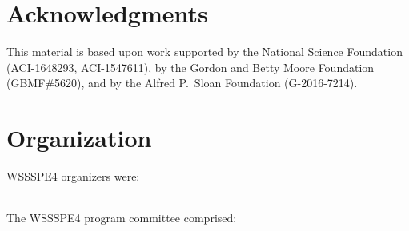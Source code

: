\documentclass[11pt, oneside]{amsart}
\newcommand{\todo}[1]{{\color{blue}$\blacksquare$~\textsf{[TODO: #1]}}}
\begin{document}


\section*{Acknowledgments} \label{sec:acks}

This material is based upon work supported by the National Science Foundation (ACI-1648293, ACI-1547611),
by the Gordon and Betty Moore Foundation (GBMF\#5620),
and by the Alfred P.~Sloan Foundation (G-2016-7214).


\newpage
\appendix
\section{Organization}  \label{sec:orgcom}

WSSSPE4 organizers were:

{\scriptsize
\begin{longtable}{lll}

\end{longtable}
}


The WSSSPE4 program committee comprised:

{\scriptsize
\begin{longtable}{lll}

\end{longtable}
}


\newpage



\end{document}
